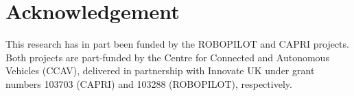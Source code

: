 \documentclass[runningheads,twocolumn,a4paper,10pt]{llncs}
\begin{document}










\section{Acknowledgement}
This research has in part been funded by the ROBOPILOT and CAPRI projects. Both
projects are part-funded by the Centre for Connected and Autonomous
Vehicles (CCAV), delivered in partnership with Innovate UK under grant numbers
103703 (CAPRI) and 103288 (ROBOPILOT), respectively.



\end{document}
